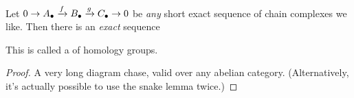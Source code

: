 \begin{theorem}
	\label{thm:long_exact}
	Let $0 \to A_\bullet \xrightarrow{f} B_\bullet \xrightarrow{g} C_\bullet \to 0$
	be \emph{any} short exact sequence of chain complexes we like.
	Then there is an \emph{exact} sequence
	\begin{center}
	\end{center}
	This is called a  of homology groups.
\end{theorem}
\begin{proof}
	A very long diagram chase, valid over any abelian category.
	(Alternatively, it's actually possible to use the snake lemma twice.)
\end{proof}

